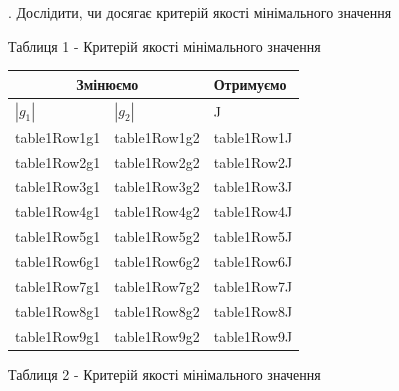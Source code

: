 \documentclass[a4paper]{article}
\begin{document}
\hfill \break
{}. Дослідити, чи досягає критерій якості мінімального значення

\begin{center}
Таблиця 1 - Критерій якості мінімального значення\\
\end{center}

\begin{center}
\begin{tabular}{ |p{3cm}||p{3cm}|p{3cm}| }
 \hline
 \multicolumn{2}{|c|}{Змінюємо} & Отримуємо\\
 \hline
 $|g_{1}|$ & $|g_{2}|$ & J \\
 \hline
 {{table1Row1g1}} & {{table1Row1g2}} & {{table1Row1J}} \\
 {{table1Row2g1}} & {{table1Row2g2}} & {{table1Row2J}} \\
 {{table1Row3g1}} & {{table1Row3g2}} & {{table1Row3J}} \\
 {{table1Row4g1}} & {{table1Row4g2}} & {{table1Row4J}} \\
 {{table1Row5g1}} & {{table1Row5g2}} & {{table1Row5J}} \\
 {{table1Row6g1}} & {{table1Row6g2}} & {{table1Row6J}} \\
 {{table1Row7g1}} & {{table1Row7g2}} & {{table1Row7J}} \\
 {{table1Row8g1}} & {{table1Row8g2}} & {{table1Row8J}} \\
 {{table1Row9g1}} & {{table1Row9g2}} & {{table1Row9J}} \\
 \hline
\end{tabular}
\end{center}

\begin{center}
Таблиця 2 - Критерій якості мінімального значення\\
\end{center}
\end{document}
